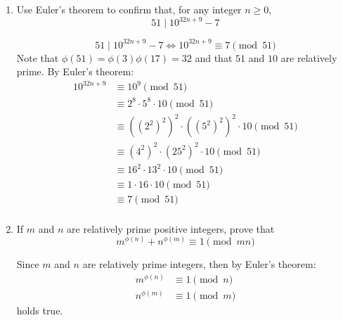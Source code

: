 \documentclass[12pt]{exam}
\theoremstyle{definition}
\begin{document}
\begin{enumerate}
\begin{enumerate}
            \end{enumerate}
      \item Use Euler's theorem to confirm that, for any integer $n \geq 0$,
            \[
                  51 \;|\; 10^{32n+9} - 7
            \]

            \begin{answer}
                  \[
                        51 \;|\; 10^{32n+9} - 7 \iff 10^{32n+9} \equiv 7 \pmod{51}
                  \]
                  Note that $\phi(51) = \phi(3)\phi(17) = 32$ and that $51$ and $10$ are relatively prime.
                  By Euler's theorem:
                  \[
                        \begin{aligned}
                              10^{32n+9} & \equiv 10^9 \pmod{51}                                           \\
                                         & \equiv 2^8 \cdot 5^8 \cdot 10 \pmod{51}                         \\
                                         & \equiv {({(2^2)}^2)}^2 \cdot {({(5^2)}^2)}^2 \cdot 10 \pmod{51} \\
                                         & \equiv {(4^2)}^2 \cdot {(25^2)}^2 \cdot 10 \pmod{51}            \\
                                         & \equiv {16}^2 \cdot {13}^2 \cdot 10 \pmod{51}                   \\
                                         & \equiv 1 \cdot 16 \cdot 10 \pmod{51}                            \\
                                         & \equiv 7 \pmod{51}                                              \\
                        \end{aligned}
                  \]
            \end{answer}

            \setcounter{enumi}{4}
      \item If $m$ and $n$ are relatively prime positive integers, prove that
            \[
                  m^{\phi(n)} + n^{\phi(m)} \equiv 1 \pmod{mn}
            \]

            \begin{answer}
                  Since $m$ and $n$ are relatively prime integers, then by Euler's theorem:
                  \[
                        \begin{aligned}
                              m^{\phi(n)} & \equiv 1 \pmod n \\
                              n^{\phi(m)} & \equiv 1 \pmod m
                        \end{aligned}
                  \]
                  holds true.


\end{answer}
\end{enumerate}
\end{document}
